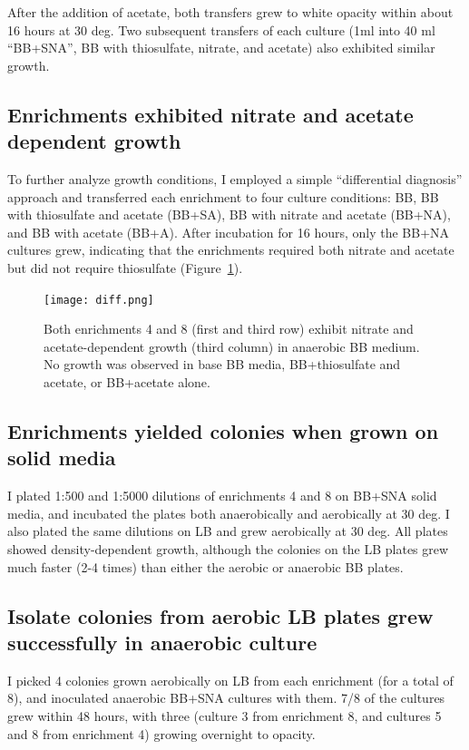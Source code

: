\documentclass{article}
\begin{document}
After the addition of acetate, both transfers grew to white opacity
within about 16 hours at 30 deg.  Two subsequent transfers of each
culture (1ml into 40 ml ``BB+SNA'', BB with thiosulfate, nitrate, and
acetate) also exhibited similar growth.

\subsection*{Enrichments exhibited nitrate and acetate dependent growth}

To further analyze growth conditions, I employed a simple
``differential diagnosis'' approach and transferred each enrichment to
four culture conditions: BB, BB with thiosulfate and acetate (BB+SA),
BB with nitrate and acetate (BB+NA), and BB with acetate (BB+A).
After incubation for 16 hours, only the BB+NA cultures grew, indicating that
the enrichments required both nitrate and acetate but did not require
thiosulfate (Figure~\ref{fig:diff}).

\begin{figure}[!ht]
  \centerline{\texttt{[image: diff.png]}}
  \caption{Both enrichments 4 and 8 (first and third row) exhibit
    nitrate and acetate-dependent growth (third column) in anaerobic BB medium. No growth was observed in base BB media, BB+thiosulfate and acetate, or BB+acetate alone.}
  \label{fig:diff}
\end{figure}


\subsection*{Enrichments yielded colonies when grown on solid media}

I plated 1:500 and 1:5000 dilutions of enrichments 4 and 8 on BB+SNA
solid media, and incubated the plates both anaerobically and
aerobically at 30 deg.  I also plated the same dilutions on LB and
grew aerobically at 30 deg.  All plates showed density-dependent growth,
although the colonies on the LB plates grew much faster (2-4 times)
than either the aerobic or anaerobic BB plates.

\subsection*{Isolate colonies from aerobic LB plates grew successfully
  in anaerobic culture}

I picked 4 colonies grown aerobically on LB from each enrichment (for
a total of 8), and inoculated anaerobic BB+SNA cultures with them.
7/8 of the cultures grew within 48 hours, with three (culture 3 from
enrichment 8, and cultures 5 and 8 from enrichment 4) growing
overnight to opacity.
\end{document}
